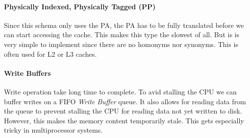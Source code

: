\paragraph{Physically Indexed, Physically Tagged (PP)}
Since this schema only uses the PA, the PA has to be fully translated before we can start accessing the cache. This makes this type the slowest of all. But is is very simple to implement since there are no homonyms nor synonyms. This is often used for L2 or L3 caches.

\paragraph{Write Buffers}
Write operation take long time to complete. To avid stalling the CPU we can buffer writes on a FIFO \textit{Write Buffer} queue. It also allows for reading data from the queue to prevent stalling the CPU for reading data not yet written to disk. However, this makes the memory content temporarily stale. This gets especially tricky in multiprocessor systems.
